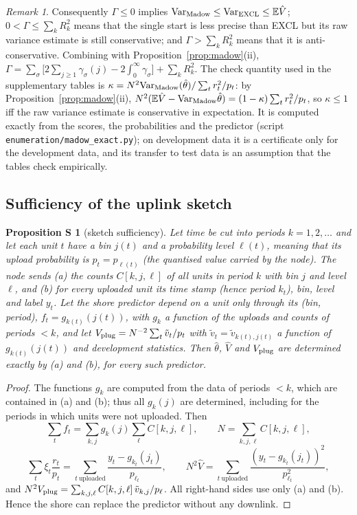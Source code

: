 \documentclass[11pt]{article}
\newtheorem{supp}{Proposition S}
\theoremstyle{remark}
\newtheorem{remark}{Remark}
\newcommand{\E}{\mathbb{E}}
\newcommand{\Var}{\mathrm{Var}}
\newcommand{\hth}{\hat\theta}
\newcommand{\hV}{\hat V}
\begin{document}
\begin{remark}
Consequently $\Gamma\le0$ implies $\Var_{\rm Madow}\le\Var_{\rm EXCL}\le\E\hV$; $0<\Gamma\le\sum_kR_k^2$ means that the single start is less precise than EXCL but its raw variance estimate is still conservative; and $\Gamma>\sum_kR_k^2$ means that it is anti-conservative. Combining with Proposition~\ref{prop:madow}(ii), $\Gamma=\sum_\sigma\big[2\sum_{j\ge1}\gamma_\sigma(j)-2\int_0^\infty\gamma_\sigma\big]+\sum_kR_k^2$. The check quantity used in the supplementary tables is $\kappa=N^2\Var_{\rm Madow}(\hth)/\sum_tr_t^2/p_t$: by Proposition~\ref{prop:madow}(ii), $N^2(\E\hV-\Var_{\rm Madow}\hth)=(1-\kappa)\sum_tr_t^2/p_t$, so $\kappa\le1$ iff the raw variance estimate is conservative in expectation. It is computed exactly from the scores, the probabilities and the predictor (script \texttt{enumeration/madow\_exact.py}); on development data it is a certificate only for the development data, and its transfer to test data is an assumption that the tables check empirically.
\end{remark}

\subsection{Sufficiency of the uplink sketch}
\begin{supp}[sketch sufficiency]\label{supp:sketch}
Let time be cut into periods $k=1,2,\dots$ and let each unit $t$ have a bin $j(t)$ and a probability level $\ell(t)$, meaning that its upload probability is $p_t=p_{\ell(t)}$ (the quantised value carried by the node). The node sends (a) the counts $C[k,j,\ell]$ of all units in period $k$ with bin $j$ and level $\ell$, and (b) for every uploaded unit its time stamp (hence period $k_t$), bin, level and label $y_t$. Let the shore predictor depend on a unit only through its (bin, period), $f_t=g_{k(t)}(j(t))$, with $g_k$ a function of the uploads and counts of periods $<k$, and let $V_{\rm plug}=N^{-2}\sum_t\tilde v_t/p_t$ with $\tilde v_t=\tilde v_{k(t),j(t)}$ a function of $g_{k(t)}(j(t))$ and development statistics. Then $\hth$, $\hV$ and $V_{\rm plug}$ are determined exactly by (a) and (b), for every such predictor.
\end{supp}

\begin{proof}
The functions $g_k$ are computed from the data of periods $<k$, which are contained in (a) and (b); thus all $g_k(j)$ are determined, including for the periods in which units were not uploaded. Then
\[
\sum_tf_t=\sum_{k,j}g_k(j)\sum_\ell C[k,j,\ell],\qquad N=\sum_{k,j,\ell}C[k,j,\ell],
\]
\[
\sum_t\xi_t\frac{r_t}{p_t}=\sum_{t\ \text{uploaded}}\frac{y_t-g_{k_t}(j_t)}{p_{\ell_t}},\qquad
N^2\hV=\sum_{t\ \text{uploaded}}\frac{(y_t-g_{k_t}(j_t))^2}{p_{\ell_t}^2},
\]
and $N^2V_{\rm plug}=\sum_{k,j,\ell}C[k,j,\ell]\,\tilde v_{k,j}/p_\ell$. All right-hand sides use only (a) and (b). Hence the shore can replace the predictor without any downlink.
\end{proof}
\end{document}

